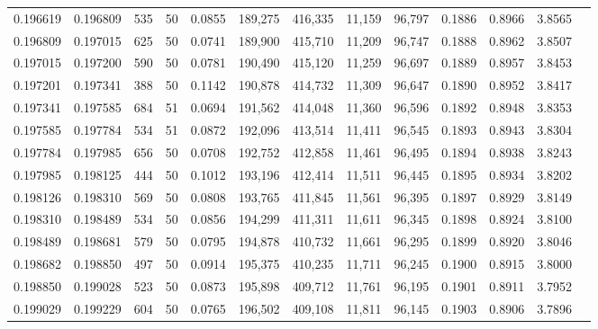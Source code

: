 \begin{tabular}{rrrrrrrrrrrrr}
0.196619 & 0.196809 &   535 &  50 &                                     0.0855 & 189,275 & 416,335 &  11,159 &  96,797 & 0.1886 & 0.8966 & 3.8565 \\
0.196809 & 0.197015 &   625 &  50 &                                     0.0741 & 189,900 & 415,710 &  11,209 &  96,747 & 0.1888 & 0.8962 & 3.8507 \\
0.197015 & 0.197200 &   590 &  50 &                                     0.0781 & 190,490 & 415,120 &  11,259 &  96,697 & 0.1889 & 0.8957 & 3.8453 \\
0.197201 & 0.197341 &   388 &  50 &                                     0.1142 & 190,878 & 414,732 &  11,309 &  96,647 & 0.1890 & 0.8952 & 3.8417 \\
0.197341 & 0.197585 &   684 &  51 &                                     0.0694 & 191,562 & 414,048 &  11,360 &  96,596 & 0.1892 & 0.8948 & 3.8353 \\
0.197585 & 0.197784 &   534 &  51 &                                     0.0872 & 192,096 & 413,514 &  11,411 &  96,545 & 0.1893 & 0.8943 & 3.8304 \\
0.197784 & 0.197985 &   656 &  50 &                                     0.0708 & 192,752 & 412,858 &  11,461 &  96,495 & 0.1894 & 0.8938 & 3.8243 \\
0.197985 & 0.198125 &   444 &  50 &                                     0.1012 & 193,196 & 412,414 &  11,511 &  96,445 & 0.1895 & 0.8934 & 3.8202 \\
0.198126 & 0.198310 &   569 &  50 &                                     0.0808 & 193,765 & 411,845 &  11,561 &  96,395 & 0.1897 & 0.8929 & 3.8149 \\
0.198310 & 0.198489 &   534 &  50 &                                     0.0856 & 194,299 & 411,311 &  11,611 &  96,345 & 0.1898 & 0.8924 & 3.8100 \\
0.198489 & 0.198681 &   579 &  50 &                                     0.0795 & 194,878 & 410,732 &  11,661 &  96,295 & 0.1899 & 0.8920 & 3.8046 \\
0.198682 & 0.198850 &   497 &  50 &                                     0.0914 & 195,375 & 410,235 &  11,711 &  96,245 & 0.1900 & 0.8915 & 3.8000 \\
0.198850 & 0.199028 &   523 &  50 &                                     0.0873 & 195,898 & 409,712 &  11,761 &  96,195 & 0.1901 & 0.8911 & 3.7952 \\
0.199029 & 0.199229 &   604 &  50 &                                     0.0765 & 196,502 & 409,108 &  11,811 &  96,145 & 0.1903 & 0.8906 & 3.7896 \\

\end{tabular}

